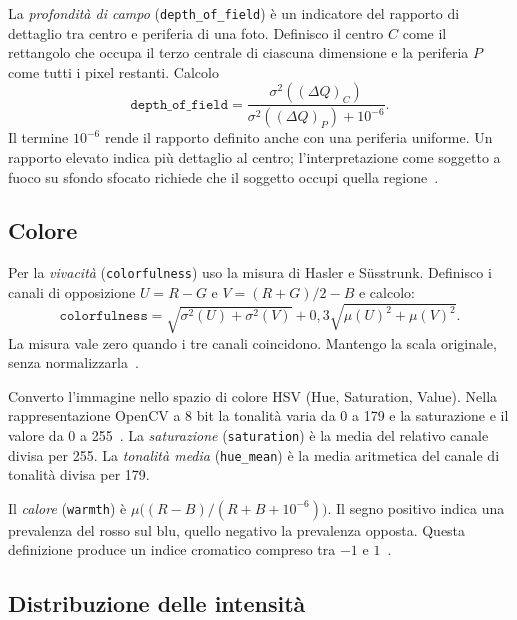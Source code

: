 La \emph{profondità di campo} (\texttt{depth\_of\_field}) è un indicatore del rapporto di dettaglio tra centro e periferia di una foto. Definisco il centro $C$ come il rettangolo che occupa il terzo centrale di ciascuna dimensione e la periferia $P$ come tutti i pixel restanti. Calcolo
\begin{equation}
    \texttt{depth\_of\_field}=
    \frac{\sigma^2((\Delta Q)_C)}{\sigma^2((\Delta Q)_P)+10^{-6}}.
    \label{eq:feature-profondita-campo}
\end{equation}
Il termine $10^{-6}$ rende il rapporto definito anche con una periferia uniforme. Un rapporto elevato indica più dettaglio al centro; l'interpretazione come soggetto a fuoco su sfondo sfocato richiede che il soggetto occupi quella regione~\cite{10.1007/11744078_23}.

\subsection{Colore}
\label{subsec:feature-colore}

Per la \emph{vivacità} (\texttt{colorfulness}) uso la misura di Hasler e Süsstrunk. Definisco i canali di opposizione $U=R-G$ e $V=(R+G)/2-B$ e calcolo:
\begin{equation}
    \texttt{colorfulness}=
    \sqrt{\sigma^2(U)+\sigma^2(V)}+
    0{,}3\sqrt{\mu(U)^2+\mu(V)^2}.
    \label{eq:feature-vivacita}
\end{equation}
La misura vale zero quando i tre canali coincidono. Mantengo la scala originale, senza normalizzarla~\cite{10.1117/12.477378}.

Converto l'immagine nello spazio di colore HSV (Hue, Saturation, Value). Nella rappresentazione OpenCV a 8 bit la tonalità varia da 0 a 179 e la saturazione e il valore da 0 a 255~\cite{opencv_library}. La \emph{saturazione} (\texttt{saturation}) è la media del relativo canale divisa per 255. La \emph{tonalità media} (\texttt{hue\_mean}) è la media aritmetica del canale di tonalità divisa per 179.

Il \emph{calore} (\texttt{warmth}) è $\mu\bigl((R-B)/(R+B+10^{-6})\bigr)$. Il segno positivo indica una prevalenza del rosso sul blu, quello negativo la prevalenza opposta. Questa definizione produce un indice cromatico compreso tra $-1$ e $1$~\cite{Jonauskaite2024}.

\subsection{Distribuzione delle intensità}
\label{subsec:feature-distribuzione}

